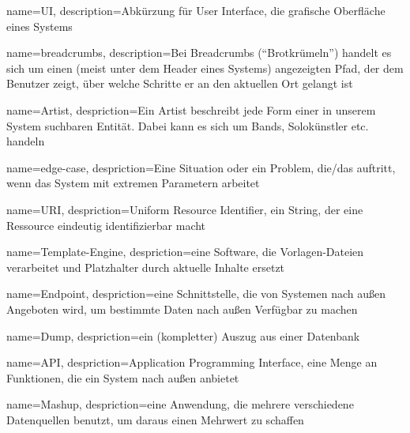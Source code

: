 {
  name=UI,
  description={Abkürzung für User Interface, die grafische Oberfläche eines Systems}
}

{
	name=breadcrumbs,
	description={Bei Breadcrumbs (“Brotkrümeln”) handelt es sich um einen (meist unter dem Header eines Systems) angezeigten Pfad, der dem Benutzer zeigt, über welche Schritte er an den aktuellen Ort gelangt ist}
}

{
	name=Artist,
	despriction={Ein Artist beschreibt jede Form einer in unserem System suchbaren Entität. Dabei kann es sich um Bands, Solokünstler etc. handeln}	
}

{
	name=edge-case,
	despriction={Eine Situation oder ein Problem, die/das auftritt, wenn das System mit extremen Parametern arbeitet}	
}

{
	name=URI,
	despriction={Uniform Resource Identifier, ein String, der eine Ressource eindeutig identifizierbar macht}	
}

{
	name=Template-Engine,
	despriction={eine Software, die Vorlagen-Dateien verarbeitet und Platzhalter durch aktuelle Inhalte ersetzt}	
}

{
	name=Endpoint,
	despriction={eine Schnittstelle, die von Systemen nach außen Angeboten wird, um bestimmte Daten nach außen Verfügbar zu machen}	
}

{
	name=Dump,
	despriction={ein (kompletter) Auszug aus einer Datenbank}	
}

{
	name=API,
	despriction={Application Programming Interface, eine Menge an Funktionen, die ein System nach außen anbietet}	
}

{
	name=Mashup,
	despriction={eine Anwendung, die mehrere verschiedene Datenquellen benutzt, um daraus einen Mehrwert zu schaffen}	
}